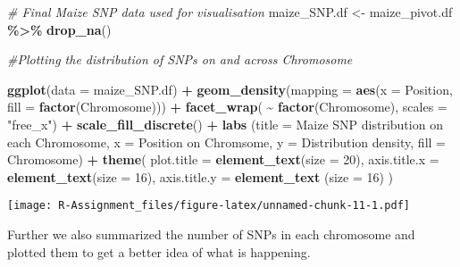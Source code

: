 \documentclass[
]{article}
\newenvironment{Shaded}{\begin{snugshade}}{\end{snugshade}}
\newcommand{\AttributeTok}[1]{\textcolor[rgb]{0.13,0.29,0.53}{#1}}
\newcommand{\CommentTok}[1]{\textcolor[rgb]{0.56,0.35,0.01}{\textit{#1}}}
\newcommand{\DecValTok}[1]{\textcolor[rgb]{0.00,0.00,0.81}{#1}}
\newcommand{\FunctionTok}[1]{\textcolor[rgb]{0.13,0.29,0.53}{\textbf{#1}}}
\newcommand{\NormalTok}[1]{#1}
\newcommand{\OtherTok}[1]{\textcolor[rgb]{0.56,0.35,0.01}{#1}}
\newcommand{\SpecialCharTok}[1]{\textcolor[rgb]{0.81,0.36,0.00}{\textbf{#1}}}
\newcommand{\StringTok}[1]{\textcolor[rgb]{0.31,0.60,0.02}{#1}}
\begin{document}
\begin{Shaded}
\begin{Highlighting}[]
\CommentTok{\# Final Maize SNP data used for visualisation}
\NormalTok{maize\_SNP.df }\OtherTok{\textless{}{-}}\NormalTok{ maize\_pivot.df }\SpecialCharTok{\%\textgreater{}\%} \FunctionTok{drop\_na}\NormalTok{()}


\CommentTok{\#Plotting the distribution of SNPs on and across Chromosome}

\FunctionTok{ggplot}\NormalTok{(}\AttributeTok{data =}\NormalTok{ maize\_SNP.df) }\SpecialCharTok{+} 
  \FunctionTok{geom\_density}\NormalTok{(}\AttributeTok{mapping =} \FunctionTok{aes}\NormalTok{(}\AttributeTok{x =}\NormalTok{ Position, }\AttributeTok{fill =} \FunctionTok{factor}\NormalTok{(Chromosome))) }\SpecialCharTok{+} 
  \FunctionTok{facet\_wrap}\NormalTok{( }\SpecialCharTok{\textasciitilde{}} \FunctionTok{factor}\NormalTok{(Chromosome), }\AttributeTok{scales =} \StringTok{"free\_x"}\NormalTok{) }\SpecialCharTok{+} 
  \FunctionTok{scale\_fill\_discrete}\NormalTok{() }\SpecialCharTok{+} 
  \FunctionTok{labs}\NormalTok{ (}\AttributeTok{title =} \StringTok{\textquotesingle{}Maize SNP distribution on each Chromosome\textquotesingle{}}\NormalTok{, }
        \AttributeTok{x =} \StringTok{\textquotesingle{}Position on Chromsome\textquotesingle{}}\NormalTok{, }
        \AttributeTok{y =} \StringTok{\textquotesingle{}Distribution density\textquotesingle{}}\NormalTok{, }
        \AttributeTok{fill =} \StringTok{\textquotesingle{}Chromosome\textquotesingle{}}\NormalTok{) }\SpecialCharTok{+} 
  \FunctionTok{theme}\NormalTok{( }\AttributeTok{plot.title =} \FunctionTok{element\_text}\NormalTok{(}\AttributeTok{size =} \DecValTok{20}\NormalTok{),}
         \AttributeTok{axis.title.x =} \FunctionTok{element\_text}\NormalTok{(}\AttributeTok{size =} \DecValTok{16}\NormalTok{),}
         \AttributeTok{axis.title.y =} \FunctionTok{element\_text}\NormalTok{ (}\AttributeTok{size =} \DecValTok{16}\NormalTok{)}
\NormalTok{  )}
\end{Highlighting}
\end{Shaded}

\texttt{[image: R-Assignment\_files/figure-latex/unnamed-chunk-11-1.pdf]}

Further we also summarized the number of SNPs in each chromosome and
plotted them to get a better idea of what is happening.
\end{document}
